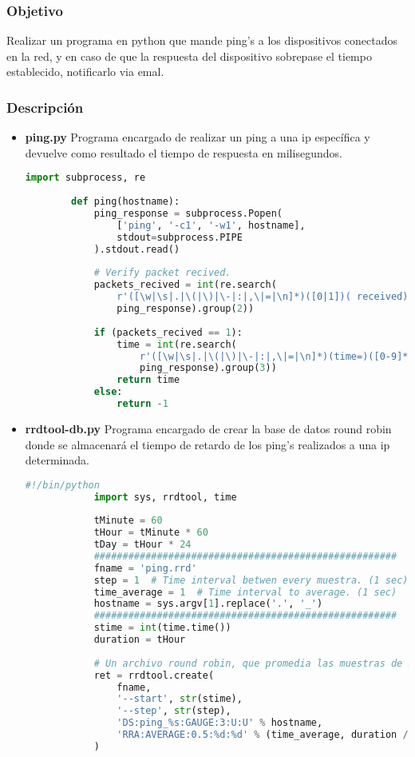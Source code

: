 \subsubsection{Objetivo}
Realizar un programa en python que mande ping's a los dispositivos conectados en la red, y en caso de que la respuesta del dispositivo sobrepase el tiempo establecido, notificarlo via emal.

\subsubsection{Descripción}
\begin{itemize}
	\item {\bf ping.py} Programa encargado de realizar un ping a una ip específica y devuelve como resultado el tiempo de respuesta en milisegundos.\\
	\begin{lstlisting}[language=python]
		import subprocess, re
		
		def ping(hostname):
			ping_response = subprocess.Popen(
				['ping', '-c1', '-w1', hostname],
				stdout=subprocess.PIPE
			).stdout.read()
			
			# Verify packet recived.
			packets_recived = int(re.search(
				r'([\w|\s|.|\(|\)|\-|:|,\|=|\n]*)([0|1])( received)',
				ping_response).group(2))
			
			if (packets_recived == 1):
				time = int(re.search(
					r'([\w|\s|.|\(|\)|\-|:|,\|=|\n]*)(time=)([0-9]*)([.|0-9]*)( ms)',
					ping_response).group(3))
				return time
			else:
				return -1
	\end{lstlisting}
	
	\item {\bf rrdtool-db.py} Programa encargado de crear la base de datos round robin donde se almacenará el tiempo de retardo de los ping's realizados a una ip determinada.\\
		\begin{lstlisting}[language=python]
			#!/bin/python
			import sys, rrdtool, time
			
			tMinute = 60
			tHour = tMinute * 60
			tDay = tHour * 24
			#####################################################
			fname = 'ping.rrd'
			step = 1  # Time interval betwen every muestra. (1 sec)
			time_average = 1  # Time interval to average. (1 sec)
			hostname = sys.argv[1].replace('.', '_')
			#####################################################
			stime = int(time.time())
			duration = tHour
			
			# Un archivo round robin, que promedia las muestras de 5s durante una hora.
			ret = rrdtool.create(
				fname,
				'--start', str(stime),
				'--step', str(step),
				'DS:ping_%s:GAUGE:3:U:U' % hostname,
				'RRA:AVERAGE:0.5:%d:%d' % (time_average, duration / time_average),
			)
			

\end{lstlisting}
\end{itemize}
